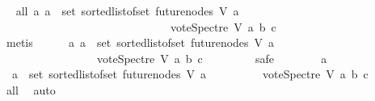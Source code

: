 \begin{isabellebody}
\ \isamarkupfalse%
\ all{}{}{\isacharcolon}{\kern0pt}\ {\isachardoublequoteopen}{\isasymforall}a{}{\isachardot}{\kern0pt}\ a{}\ {\isasymin}\ set\ {\isacharparenleft}{\kern0pt}sorted{\isacharunderscore}{\kern0pt}list{\isacharunderscore}{\kern0pt}of{\isacharunderscore}{\kern0pt}set\ {\isacharparenleft}{\kern0pt}future{\isacharunderscore}{\kern0pt}nodes\ V\ a{\isacharparenright}{\kern0pt}{\isacharparenright}{\kern0pt}\ {\isasymlongrightarrow}\isanewline
\ \ \ \ \ \ \ \ \ \ \ \ \ \ \ \ \ \ \ \ \ \ \ \ \ \ \ \ \ \ vote{\isacharunderscore}{\kern0pt}Spectre\ V\ a{}\ b\ c\ {\isasymin}\ {\isacharbraceleft}{\kern0pt}{}{\isacharcomma}{\kern0pt}{}{\isacharbraceright}{\kern0pt}{\isachardoublequoteclose}\isanewline
\ \ \ \ \ \ \isamarkupfalse%
\ {}\isanewline
\ \ \ \ \ \ \isamarkupfalse%
\ metis\isanewline
\ \ \ \ \isamarkupfalse%
\ {\isachardoublequoteopen}{\isasymforall}a{}{\isachardot}{\kern0pt}\ a{}\ {\isasymin}\ set\ {\isacharparenleft}{\kern0pt}sorted{\isacharunderscore}{\kern0pt}list{\isacharunderscore}{\kern0pt}of{\isacharunderscore}{\kern0pt}set\ {\isacharparenleft}{\kern0pt}future{\isacharunderscore}{\kern0pt}nodes\ V\ a{\isacharparenright}{\kern0pt}{\isacharparenright}{\kern0pt}\ \isanewline
\ \ \ \ \ \ \ \ \ \ \ \ \ \ \ \ {\isasymlongrightarrow}\ vote{\isacharunderscore}{\kern0pt}Spectre\ V\ a{}\ b\ c\ {\isasymge}\ {}{\isachardoublequoteclose}\ \isanewline
\ \ \ \ \isamarkupfalse%
\ safe\isanewline
\ \ \ \ \ \ \isamarkupfalse%
\ a{}\isanewline
\ \ \ \ \ \ \isamarkupfalse%
\ {\isachardoublequoteopen}\ a{}\ {\isasymin}\ set\ {\isacharparenleft}{\kern0pt}sorted{\isacharunderscore}{\kern0pt}list{\isacharunderscore}{\kern0pt}of{\isacharunderscore}{\kern0pt}set\ {\isacharparenleft}{\kern0pt}future{\isacharunderscore}{\kern0pt}nodes\ V\ a{\isacharparenright}{\kern0pt}{\isacharparenright}{\kern0pt}{\isachardoublequoteclose}\isanewline
\ \ \ \ \ \ \isamarkupfalse%
\ \isamarkupfalse%
\ {\isachardoublequoteopen}vote{\isacharunderscore}{\kern0pt}Spectre\ V\ a{}\ b\ c\ {\isasymin}\ {\isacharbraceleft}{\kern0pt}{}{\isacharcomma}{\kern0pt}\ {}{\isacharbraceright}{\kern0pt}{\isachardoublequoteclose}\ \isamarkupfalse%
\ all{}{}\ \isamarkupfalse%
\ auto\isanewline
\ \ \ \ \ \ \isamarkupfalse%

\end{isabellebody}

